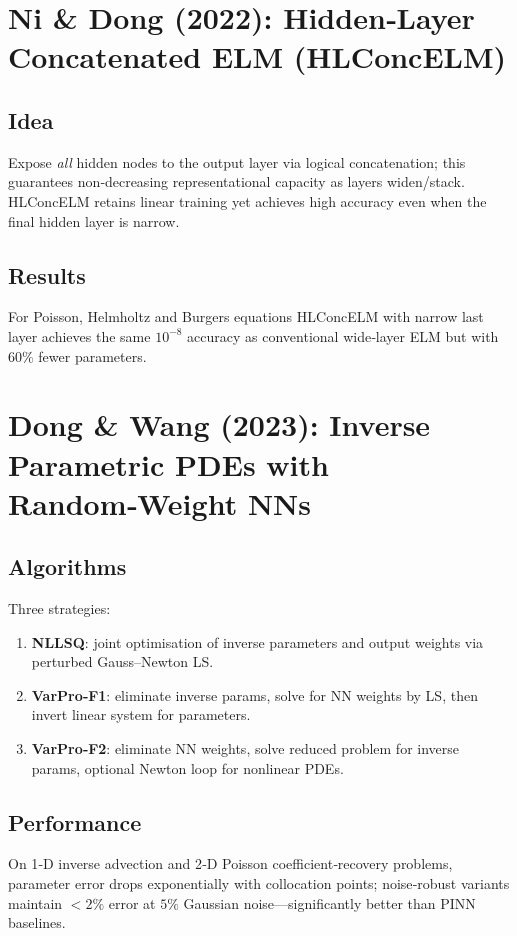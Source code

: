 \documentclass{article}
\begin{document}
\section{Ni \& Dong (2022): Hidden‑Layer Concatenated ELM (HLConcELM)}
\subsection*{Idea}
Expose \emph{all} hidden nodes to the output layer via logical concatenation; this guarantees non‑decreasing representational capacity as layers widen/stack.  HLConcELM retains linear training yet achieves high accuracy even when the final hidden layer is narrow.

\subsection*{Results}
For Poisson, Helmholtz and Burgers equations HLConcELM with narrow last layer achieves the same $10^{-8}$ accuracy as conventional wide‑layer ELM but with $60\%$ fewer parameters.

\section{Dong \& Wang (2023): Inverse Parametric PDEs with Random‑Weight NNs}
\subsection*{Algorithms}
Three strategies:
\begin{enumerate}
\item \textbf{NLLSQ}: joint optimisation of inverse parameters and output weights via perturbed Gauss–Newton LS.
\item \textbf{VarPro‑F1}: eliminate inverse params, solve for NN weights by LS, then invert linear system for parameters.
\item \textbf{VarPro‑F2}: eliminate NN weights, solve reduced problem for inverse params, optional Newton loop for nonlinear PDEs.
\end{enumerate}

\subsection*{Performance}
On 1‑D inverse advection and 2‑D Poisson coefficient‑recovery problems, parameter error drops exponentially with collocation points; noise‑robust variants maintain $<2\%$ error at $5\%$ Gaussian noise—significantly better than PINN baselines.
\end{document}
